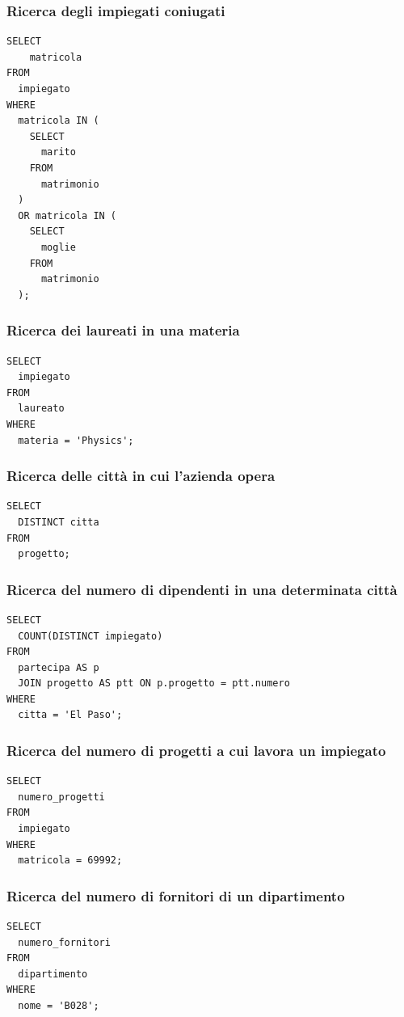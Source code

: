 \documentclass{article}
\begin{document}
\newpage

\subsubsection{Ricerca degli impiegati coniugati}
\begin{verbatim}
SELECT 
    matricola 
FROM 
  impiegato 
WHERE 
  matricola IN (
    SELECT 
      marito 
    FROM 
      matrimonio
  ) 
  OR matricola IN (
    SELECT 
      moglie 
    FROM 
      matrimonio
  );
\end{verbatim}

\subsubsection{Ricerca dei laureati in una materia}
\begin{verbatim}
SELECT 
  impiegato 
FROM 
  laureato 
WHERE 
  materia = 'Physics';
\end{verbatim}

\subsubsection{Ricerca delle città in cui l'azienda opera}
\begin{verbatim}
SELECT 
  DISTINCT citta 
FROM 
  progetto;
\end{verbatim}

\subsubsection{Ricerca del numero di dipendenti in una determinata città}
\begin{verbatim}
SELECT 
  COUNT(DISTINCT impiegato) 
FROM 
  partecipa AS p 
  JOIN progetto AS ptt ON p.progetto = ptt.numero 
WHERE 
  citta = 'El Paso';
\end{verbatim}

\subsubsection{Ricerca del numero di progetti a cui lavora un impiegato}
\begin{verbatim}
SELECT 
  numero_progetti 
FROM 
  impiegato 
WHERE 
  matricola = 69992;
\end{verbatim}

\newpage

\subsubsection{Ricerca del numero di fornitori di un dipartimento}
\begin{verbatim}
SELECT 
  numero_fornitori 
FROM 
  dipartimento 
WHERE 
  nome = 'B028';
\end{verbatim}
\end{document}
